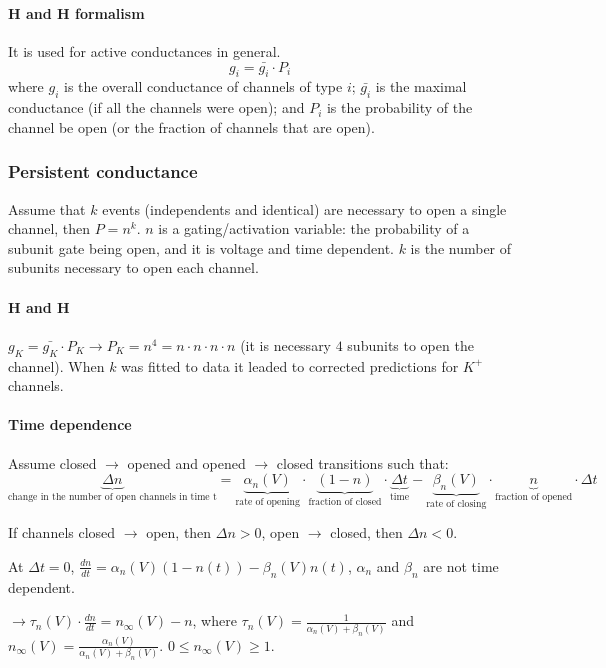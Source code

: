 \documentclass[main]{subfiles}
\begin{document}
\paragraph{H and H formalism} It is used for active conductances in general.
\[g_i = \bar{g_i} \cdot P_i \] where $g_i$ is the overall conductance of channels of type $i$; $\bar{g_i}$ is the maximal conductance (if all the channels were open); and $P_i$ is the probability of the channel be open (or the fraction of channels that are open).

\subsubsection{Persistent conductance}
Assume that $k$ events (independents and identical) are necessary to open a single channel, then $P = n^k$.
$n$ is a gating/activation variable: the probability of a subunit gate being open, and it is voltage and time dependent.
$k$ is the number of subunits necessary to open each channel.

\paragraph{H and H} $g_K = \bar{g_K} \cdot P_K \rightarrow P_K = n^4 = n \cdot n \cdot n \cdot n$ (it is necessary $4$ subunits to open the channel).
When $k$ was fitted to data it leaded to corrected predictions for $K^+$ channels.

\paragraph{Time dependence}

Assume closed $\rightarrow$ opened and opened $\rightarrow$ closed transitions such that:
\[\underbrace{\Delta n}_\text{change in the number of open channels in time t} = \underbrace{\alpha_n (V)}_\text{rate of opening} \cdot \underbrace{(1-n)}_\text{fraction of closed} \cdot \underbrace{\Delta t}_\text{time} - \underbrace{\beta_n (V)}_\text{rate of closing} \cdot \underbrace{n}_\text{fraction of opened} \cdot \Delta t \]

If channels closed $\rightarrow$ open, then $\Delta n > 0$, open $\rightarrow$ closed, then $\Delta n < 0$.

At $\Delta t = 0$, $\frac{dn}{dt} = \alpha_n (V) (1 - n(t)) - \beta_n (V) n(t)$, $\alpha_n$ and $\beta_n$ are not time dependent.

$\rightarrow \tau_n(V) \cdot \frac{dn}{dt} = n_\infty(V) - n$,
where $\tau_n(V) = \frac{1}{\alpha_n(V) + \beta_n(V)}$ and $n_\infty(V) = \frac{\alpha_n(V)}{\alpha_n(V) + \beta_n(V)}$. $0 \leq n_\infty(V) \geq 1$.
\end{document}

